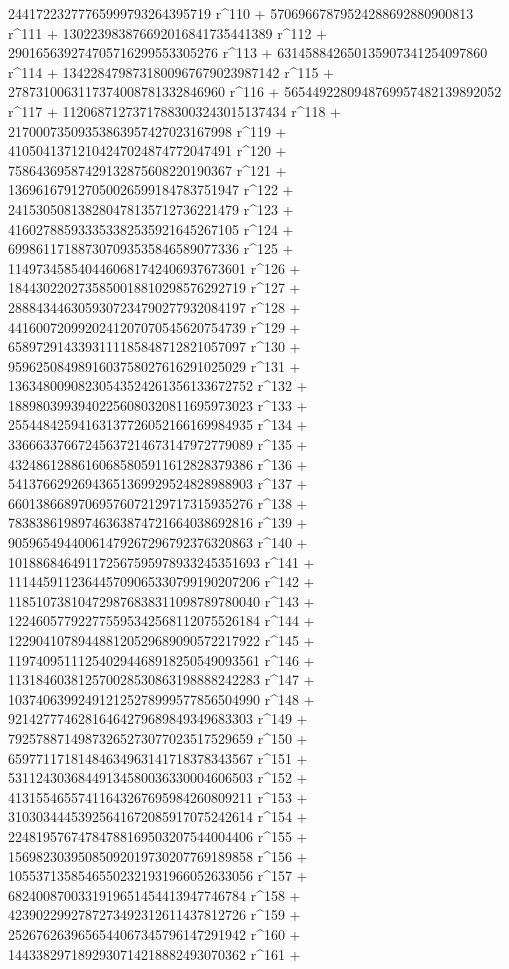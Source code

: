        24417223277765999793264395719 r^110 + 
       57069667879524288692880900813 r^111 + 
       130223983876692016841735441389 r^112 + 
       290165639274705716299553305276 r^113 + 
       631458842650135907341254097860 r^114 + 
       1342284798731800967679023987142 r^115 + 
       2787310063117374008781332846960 r^116 + 
       5654492280948769957482139892052 r^117 + 
       11206871273717883003243015137434 r^118 + 
       21700073509353863957427023167998 r^119 + 
       41050413712104247024874772047491 r^120 + 
       75864369587429132875608220190367 r^121 + 
       136961679127050026599184783751947 r^122 + 
       241530508138280478135712736221479 r^123 + 
       416027885933353382535921645267105 r^124 + 
       699861171887307093535846589077336 r^125 + 
       1149734585404460681742406937673601 r^126 + 
       1844302202735850018810298576292719 r^127 + 
       2888434463059307234790277932084197 r^128 + 
       4416007209920241207070545620754739 r^129 + 
       6589729143393111185848712821057097 r^130 + 
       9596250849891603758027616291025029 r^131 + 
       13634800908230543524261356133672752 r^132 + 
       18898039939402256080320811695973023 r^133 + 
       25544842594163137726052166169984935 r^134 + 
       33666337667245637214673147972779089 r^135 + 
       43248612886160685805911612828379386 r^136 + 
       54137662926943651369929524828988903 r^137 + 
       66013866897069576072129717315935276 r^138 + 
       78383861989746363874721664038692816 r^139 + 
       90596549440061479267296792376320863 r^140 + 
       101886846491172567595978933245351693 r^141 + 
       111445911236445709065330799190207206 r^142 + 
       118510738104729876838311098789780040 r^143 + 
       122460577922775595342568112075526184 r^144 + 
       122904107894488120529689090572217922 r^145 + 
       119740951112540294468918250549093561 r^146 + 
       113184603812570028530863198888242283 r^147 + 
       103740639924912125278999577856504990 r^148 + 
       92142777462816464279689849349683303 r^149 + 
       79257887149873265273077023517529659 r^150 + 
       65977117181484634963141718378343567 r^151 + 
       53112430368449134580036330004606503 r^152 + 
       41315546557411643267695984260809211 r^153 + 
       31030344453925641672085917075242614 r^154 + 
       22481957674784788169503207544004406 r^155 + 
       15698230395085092019730207769189858 r^156 + 
       10553713585465502321931966052633056 r^157 + 
       6824008700331919651454413947746784 r^158 + 
       4239022992787273492312611437812726 r^159 + 
       2526762639656544067345796147291942 r^160 + 
       1443382971892930714218882493070362 r^161 + 
